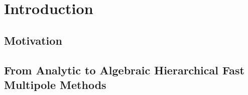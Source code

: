 \chapter{Introduction}\label{chpt:1}
% 

\section{Motivation}\label{sec:1_1_motivation}


\section{From Analytic to Algebraic Hierarchical Fast Multipole Methods}\label{sec:1_2}


